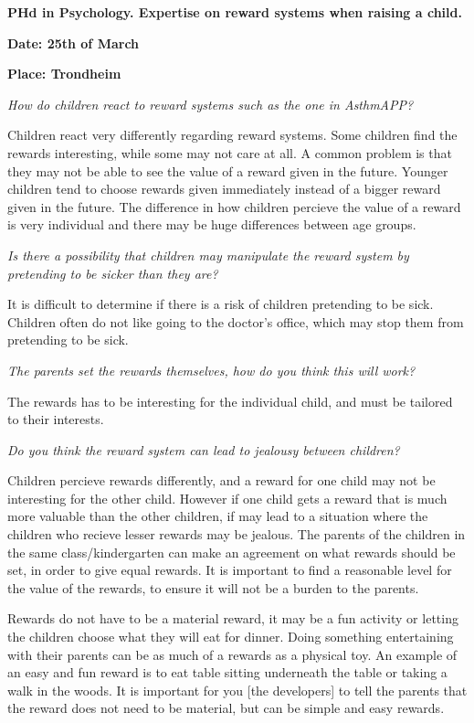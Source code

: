 \textbf{PHd in Psychology. Expertise on reward systems when raising a child.} 

\textbf{Date: 25th of March}

\textbf{Place: Trondheim}

\emph{How do children react to reward systems such as the one in AsthmAPP?}

Children react very differently regarding reward systems. Some children find the rewards interesting, while some may not care at all. A common problem is that they may not be able to see the value of a reward given in the future. Younger children tend to choose rewards given immediately instead of a bigger reward given in the future\cite{mischel1972cognitive}.
The difference in how children percieve the value of a reward is very individual and there may be huge differences between age groups. 


\emph{Is there a possibility that children may manipulate the reward system by pretending to be sicker than they are?}

It is difficult to determine if there is a risk of children pretending to be sick. Children often do not like going to the doctor's office, which may stop them from pretending to be sick.


\emph{The parents set the rewards themselves, how do you think this will work?}

The rewards has to be interesting for the individual child, and must be tailored to their interests. 

\emph{Do you think the reward system can lead to jealousy between children?}

Children percieve rewards differently, and a reward for one child may not be interesting for the other child. However if one child gets a reward that is much more valuable than the other children, if may lead to a situation where the children who recieve lesser rewards may be jealous. The parents of the children in the same class/kindergarten can make an agreement on what rewards should be set, in order to give equal rewards. It is important to find a reasonable level for the value of the rewards, to ensure it will not be a burden to the parents.

Rewards do not have to be a material reward, it may be a fun activity or letting the children choose what they will eat for dinner. Doing something entertaining with their parents can be as much of a rewards as a physical toy. An example of an easy and fun reward is to eat table sitting underneath the table or taking a walk in the woods. It is important for you [the developers] to tell the parents that the reward does not need to be material, but can be simple and easy rewards.


